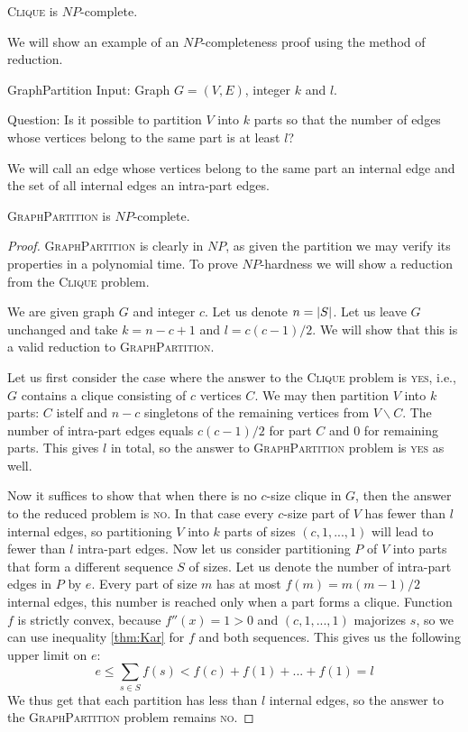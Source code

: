 \begin{thm}
\textsc{Clique} is $NP$-complete.
\end{thm}


We will show an example of an $NP$-completeness proof using the method of reduction.

\begin{problem}{GraphPartition}
Input: Graph $G = (V, E)$, integer $k$ and $l$.

Question: Is it possible to partition $V$ into $k$ parts so that the number of edges
whose vertices belong to the same part is at least $l$?
\end{problem}

We will call an edge whose vertices belong to the same part an internal edge
and the set of all internal edges an intra-part edges.

\begin{thm} \label{gp-np}
\textsc{GraphPartition} is $NP$-complete.
\end{thm}

\begin{proof}
\textsc{GraphPartition} is clearly in $NP$,
as given the partition we may verify its properties in a polynomial time.
To prove $NP$-hardness we will show a reduction from the \textsc{Clique} problem.

We are given graph $G$ and integer $c$.
Let us denote $n = \left\vert S \right\vert$.
Let us leave $G$ unchanged and take $k = n-c+1$ and $l = c(c-1)/2$.
We will show that this is a valid reduction to \textsc{GraphPartition}.

Let us first consider the case where the answer to the \textsc{Clique} problem is \textsc{yes},
i.e., $G$ contains a clique consisting of $c$ vertices $C$.
We may then partition $V$ into $k$ parts:
$C$ istelf and $n-c$ singletons of the remaining vertices from $V \backslash C$.
The number of intra-part edges equals $c(c-1)/2$ for part $C$ and $0$ for remaining parts.
This gives $l$ in total, so the answer to \textsc{GraphPartition} problem is \textsc{yes} as well.

Now it suffices to show that when there is no $c$-size clique in $G$,
then the answer to the reduced problem is \textsc{no}.
In that case every $c$-size part of $V$ has fewer than $l$ internal edges,
so partitioning $V$ into $k$ parts of sizes $(c, 1, ..., 1)$ will lead to fewer than $l$ intra-part edges.
Now let us consider partitioning $P$ of $V$ into parts that form a different sequence $S$ of sizes.
Let us denote the number of intra-part edges in $P$ by $e$.
Every part of size $m$ has at most $f(m) = m(m-1)/2$ internal edges,
this number is reached only when a part forms a clique.
Function $f$ is strictly convex, because $f''(x) = 1 > 0$ and $(c,1,...,1)$ majorizes $s$,
so we can use inequality \eqref{thm:Kar} for $f$ and both sequences.
This gives us the following upper limit on $e$:
$$e \leq \sum_{s\in{S}} f(s) < f(c) + f(1) + ... + f(1) = l$$
We thus get that each partition has less than $l$ internal edges,
so the answer to the \textsc{GraphPartition} problem remains \textsc{no}.
\end{proof}
